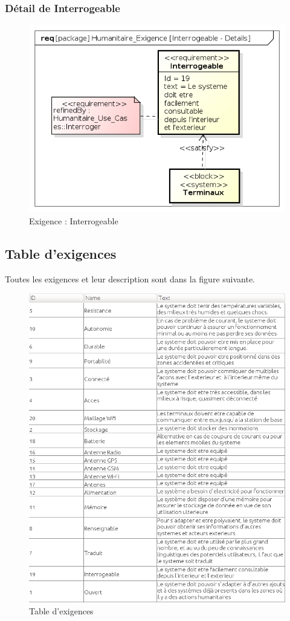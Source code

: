 \documentclass[11pt, titlepage]{report}
\begin{document}
\subsubsection{Détail de Interrogeable}
\begin{figure}[h!]
\centering
\includegraphics[scale=.4]{../images/diagrammes/sysml/exigence/interrogeable_details.png}
\caption{Exigence : Interrogeable}
\end{figure}
\clearpage
\subsection{Table d'exigences}
Toutes les exigences et leur description sont dans la figure suivante.
\begin{figure}[h!]
\centering
\includegraphics[scale=.8]{../images/diagrammes/sysml/exigence/table_exigence.png}
\caption{Table d'exigences}
\end{figure}
\newpage
\end{document}
